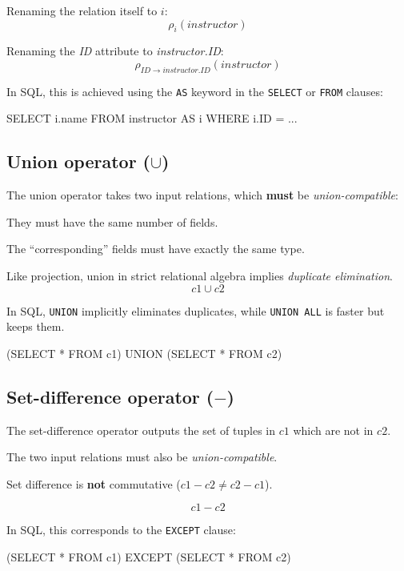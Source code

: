 \documentclass[../../dis.tex]{subfiles}
\begin{document}
Renaming the relation itself to $i$:
\[ \rho_{i}(\textit{instructor}) \]

Renaming the \textit{ID} attribute to \textit{instructor.ID}:
\[ \rho_{ID \rightarrow \textit{instructor.ID}}(\textit{instructor}) \]

In SQL, this is achieved using the \lstinline[style=SQLStyle]{AS} keyword in the \lstinline[style=SQLStyle]{SELECT} or \lstinline[style=SQLStyle]{FROM} clauses:
\begin{sql}
    SELECT i.name FROM instructor AS i WHERE i.ID = ...
\end{sql}

\subsection{Union operator ($\cup$)}
The union operator takes two input relations, which \textbf{must} be \emph{union-compatible}:
\begin{dashlist}
    \item They must have the same number of fields.
    \item The ``corresponding'' fields must have exactly the same type.
\end{dashlist}

Like projection, union in strict relational algebra implies \emph{duplicate elimination}.
\[ c1 \cup c2 \]

In SQL, \lstinline[style=SQLStyle]{UNION} implicitly eliminates duplicates, while \lstinline[style=SQLStyle]{UNION ALL} is faster but keeps them.
\begin{sql}
    (SELECT * FROM c1)
    UNION
    (SELECT * FROM c2)
\end{sql}

\subsection{Set-difference operator ($-$)}
The set-difference operator outputs the set of tuples in $c1$ which are not in $c2$.
\begin{dashlist}
    \item The two input relations must also be \emph{union-compatible}.
    \item Set difference is \textbf{not} commutative ($c1 - c2 \neq c2 - c1$).
\end{dashlist}

\[ c1 - c2 \]

In SQL, this corresponds to the \lstinline[style=SQLStyle]{EXCEPT} clause:
\begin{sql}
    (SELECT * FROM c1)
    EXCEPT
    (SELECT * FROM c2)
\end{sql}
\end{document}
